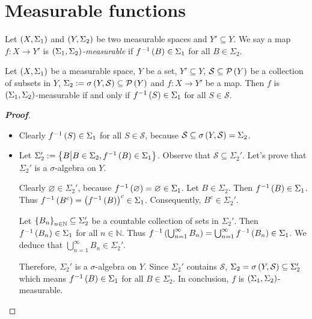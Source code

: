 \section{Measurable functions}

\begin{definition}
  Let $\left(X,\Sigma_1\right)$ and $\left(Y,\Sigma_2\right)$ be two measurable spaces and $Y'\subseteq Y$. We say a map $f:X\rightarrow Y'$ is \emph{$\left(\Sigma_1,\Sigma_2\right)$-measurable} if $f^{-1}\left(B\right)\in\Sigma_1$ for all $B\in\Sigma_2$.
\end{definition}

\begin{proposition}
  Let $\left(X,\Sigma_1\right)$ be a measurable space, $Y$ be a set, $Y'\subseteq Y$, $\mathcal{S}\subseteq\mathcal{P}\left(Y\right)$ be a collection of subsets in $Y$, $\Sigma_2:=\sigma\left(Y,\mathcal{S}\right)\subseteq\mathcal{P}\left(Y\right)$ and $f:X\rightarrow Y'$ be a map. Then $f$ is $\left(\Sigma_1,\Sigma_2\right)$-measurable if and only if $f^{-1}\left(S\right)\in\Sigma_1$ for all $S\in\mathcal{S}$.
  \begin{proof}[\rm\textbf{Proof}]
    \hfill
    \begin{itemize}
      \item[\boxed{\Rightarrow}] Clearly $f^{-1}\left(S\right)\in\Sigma_1$ for all $S\in\mathcal{S}$, because $\mathcal{S}\subseteq\sigma\left(Y,\mathcal{S}\right)=\Sigma_2$.
      \item[\boxed{\Leftarrow}] Let $\Sigma_2':=\left\{B\middle|B\in\Sigma_2,f^{-1}\left(B\right)\in\Sigma_1\right\}$. Observe that $\mathcal{S}\subseteq\Sigma_2'$. Let's prove that $\Sigma_2'$ is a $\sigma$-algebra on $Y$.
      
      Clearly $\varnothing\in\Sigma_2'$, because $f^{-1}\left(\varnothing\right)=\varnothing\in\Sigma_1$. Let $B\in\Sigma_2$. Then $f^{-1}\left(B\right)\in\Sigma_1$. Thus $f^{-1}\left(B^c\right)=\left(f^{-1}\left(B\right)\right)^c\in\Sigma_1$. Consequently, $B^c\in\Sigma_2'$.

      Let $\left\{B_n\right\}_{n\in\mathbb{N}}\subseteq\Sigma_2'$ be a countable collection of sets in $\Sigma_2'$. Then $f^{-1}\left(B_n\right)\in\Sigma_1$ for all $n\in\mathbb{N}$. Thus $f^{-1}\left(\bigcup_{n=1}^{\infty}{B_n}\right)=\bigcup_{n=1}^{\infty}{f^{-1}\left(B_n\right)}\in\Sigma_1$. We deduce that $\bigcup_{n=1}^{\infty}{B_n}\in\Sigma_2'$.

      Therefore, $\Sigma_2'$ is a $\sigma$-algebra on $Y$. Since $\Sigma_2'$ contains $\mathcal{S}$, $\Sigma_2=\sigma\left(Y,\mathcal{S}\right)\subseteq\Sigma_2'$ which means $f^{-1}\left(B\right)\in\Sigma_1$ for all $B\in\Sigma_2$. In conclusion, $f$ is $\left(\Sigma_1,\Sigma_2\right)$-measurable.
    \end{itemize}
  \end{proof}
\end{proposition}

